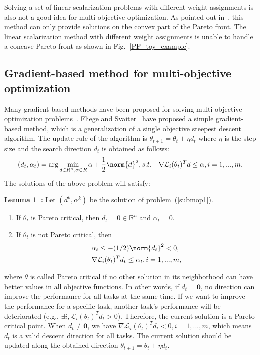 Solving a set of linear scalarization problems with different weight assignments is also not a good idea for multi-objective optimization. As pointed out in~\cite[Chapter~4.7]{boyd2004convex}, this method can only provide solutions on the convex part of the Pareto front. The linear scalarization method with different weight assignments is unable to handle a concave Pareto front as shown in Fig.~\ref{PF_toy_example}.

\subsection{Gradient-based method for multi-objective optimization}

Many gradient-based methods have been proposed for solving multi-objective optimization problems~\cite{desideri2012mutiple,fliege2016method}. Fliege and Svaiter~\cite{fliege2000steepest} have proposed a simple gradient-based method, which is a generalization of a single objective steepest descent algorithm. The update rule of the algorithm is $\theta_{t + 1} = \theta_t + \eta d_t$ where $\eta$ is the step size and the search direction $d_t$ is obtained as follows:
\begin{eqnarray}
    \label{submop1}
         (d_t,\alpha_t) = \text{arg} \min_{d\in R^n,\alpha \in R} \alpha + \frac{1}{2} \norm{d}^2, s.t.~~~ \nabla \mathcal{L}_i(\theta_t)^Td \leq \alpha,  i = 1,...,m.
\end{eqnarray}
The solutions of the above problem will satisfy:

\textbf{Lemma 1~\cite{fliege2000steepest}:} Let $(d^k,\alpha^k)$ be the solution of problem~(\ref{submop1}).
\begin{enumerate}
  \item If $\theta_t$ is Pareto critical, then $d_t = 0 \in \mathbb{R}^n$ and $\alpha_t = 0$.
  \item If $\theta_t$ is not Pareto critical, then
    \begin{eqnarray}\label{eq:bound}
    \begin{aligned}
    & \alpha_t \leq -(1/2) \norm{d_t}^2 < 0, \\
    & \nabla \mathcal{L}_i(\theta_t)^Td_t \leq \alpha_t, i = 1,...,m,
    \end{aligned}
    \end{eqnarray}
\end{enumerate}
where $\theta$ is called Pareto critical if no other solution in its neighborhood can have better values in all objective functions. In other words, if $d_t = \boldsymbol{0}$, no direction can improve the performance for all tasks at the same time. If we want to improve the performance for a specific task, another task's performance will be deteriorated (e.g., $\exists i, \mathcal{L}_i(\theta_t)^Td_t > 0$). Therefore, the current solution is a Pareto critical point. When $d_t \neq \boldsymbol{0}$, we have $\nabla \mathcal{L}_i(\theta_t)^Td_t < 0, i = 1,...,m$, which means $d_t$ is a valid descent direction for all tasks. The current solution should be updated along the obtained direction $\theta_{t + 1} = \theta_t + \eta d_t$.

